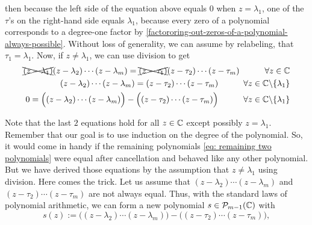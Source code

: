 \begin{prf}
  then because the left side of the equation above equals $0$ when $z=\lambda_1$, one of the $\tau$'s on the right-hand side equals $\lambda_1$, because every zero of a polynomial corresponds to a degree-one factor by \ref{factororing-out-zeros-of-a-polynomial-always-possible}. Without loss of generality, we can assume by relabeling, that $\tau_1 = \lambda_1$. Now, if $z \neq \lambda_1$, we can use division to get
  \begin{align}
    \xcancel{(z - \lambda_1)} (z - \lambda_2) \cdots (z-\lambda_m) = \xcancel{(z-\tau_1)} (z-\tau_2) \cdots (z-\tau_m) \quad \qquad \forall z \in \mathbb{C} \nonumber \\
    (z - \lambda_2) \cdots (z-\lambda_m) = (z-\tau_2) \cdots (z-\tau_m) \quad \qquad  \forall z \in \mathbb{C} \backslash \{ \lambda_1 \} \label{eq: remaining two polynomials} \\
    0 = \Big((z - \lambda_2) \cdots (z-\lambda_m) \Big) -   \Big((z-\tau_2) \cdots (z-\tau_m)\Big) \quad \qquad \forall z \in \mathbb{C} \backslash \{ \lambda_1 \} \label{eq: last equation}
  \end{align}

  Note that the last $2$ equations hold for all $z \in \mathbb{C}$ except possibly $z = \lambda_1$. Remember that our goal is to use induction on the degree of the polynomial. So, it would come in handy if the remaining polynomials \eqref{eq: remaining two polynomials} were equal after cancellation and behaved like any other polynomial. But we have derived those equations by the assumption that $z \neq \lambda_1$ using division. Here comes the trick. Let us assume that $(z - \lambda_2) \cdots (z-\lambda_m)$ and $(z - \tau_2) \cdots (z-\tau_m)$ are not always equal. Thus, with the standard laws of polynomial arithmetic, we can form a new polynomial $s \in \mathcal{P}_{m-1}(\mathbb{C})$ with
  \begin{equation}
    s(z) :=   \Big((z - \lambda_2) \cdots (z-\lambda_m)\Big) - \Big((z-\tau_2) \cdots (z-\tau_m)\Big),
  \end{equation}


\end{prf}
